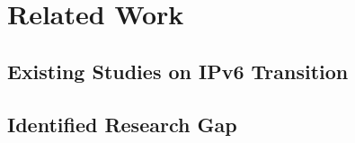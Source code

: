 \chapter{Related Work}

\section{Existing Studies on IPv6 Transition}

\section{Identified Research Gap}